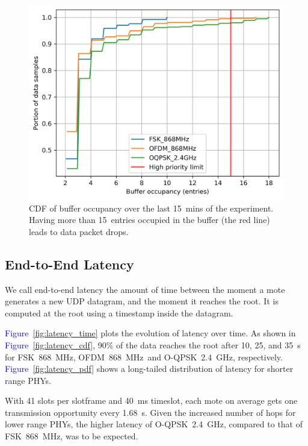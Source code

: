 \documentclass[sensors,article,submit,moreauthors,pdftex]{Definitions/mdpi}
\newcommand{\fsk}           {FSK~868~MHz}
\newcommand{\oqpsk}         {O-QPSK~2.4~GHz}
\newcommand{\ofdm}          {OFDM~868~MHz}
\newcommand{\figwidth}      {0.78}
\newcommand{\update}[1]     {\textcolor{blue}{#1}}
\begin{document}
\begin{figure}[ht]
	\centering
	\includegraphics[width=\figwidth\columnwidth]{maxBufferSize_cdf_plot_full_steady_15}
	\caption{CDF of buffer occupancy over the last 15~mins of the experiment. Having more than 15~entries occupied in the buffer (the red line) leads to data packet drops.}
    \label{fig:maxBufferSize_cdf_plot_full_steady_15}
\end{figure}

\subsection{End-to-End Latency}
\label{sec:res_latency}


We call end-to-end latency the amount of time between the moment a mote generates a new UDP datagram, and the moment it reaches the root.
It is computed at the root using a timestamp inside the datagram.


\update{Figure}~\ref{fig:latency_time} plots the evolution of latency over time.
As shown in \update{Figure}~\ref{fig:latency_cdf}, 90\% of the data reaches the root after 10, 25, and 35~s for \fsk, \ofdm\ and \oqpsk, respectively.
\update{Figure}~\ref{fig:latency_pdf} shows a long-tailed distribution of latency for shorter range PHYs.


With 41 slots per slotframe and 40~ms timeslot, each mote on average gets one transmission opportunity every 1.68~s.
Given the increased number of hops for lower range PHYs, the higher latency of \oqpsk, compared to that of \fsk, was to be expected.
\end{document}
